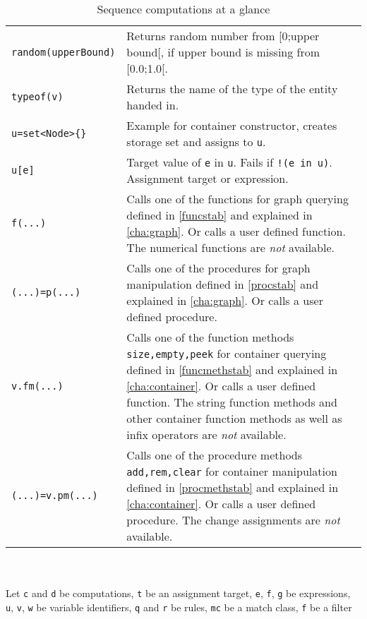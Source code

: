 \begin{table}[htbp]
\begin{minipage}{\linewidth}
\begin{tabularx}{\linewidth}{|lX|}
\texttt{random(upperBound)} & Returns random number from [0;upper bound[, if upper bound is missing from [0.0;1.0[.\\
\texttt{typeof(v)} & Returns the name of the type of the entity handed in.\\
\hline
\texttt{u=set<Node>\{\}} & Example for container constructor, creates storage set and assigns to \texttt{u}.\\
\texttt{u[e]} & Target value of \texttt{e} in \texttt{u}. Fails if \texttt{!(e in u)}. Assignment target or expression.\\
\hline
\texttt{f(...)} & Calls one of the functions for graph querying defined in \ref{funcstab} and explained in \ref{cha:graph}. Or calls a user defined function. The numerical functions are \emph{not} available.\\
\hline
\texttt{(...)=p(...)} & Calls one of the procedures for graph manipulation defined in \ref{procstab} and explained in \ref{cha:graph}. Or calls a user defined procedure.\\
\hline
\texttt{v.fm(...)} & Calls one of the function methods \texttt{size,empty,peek} for container querying defined in \ref{funcmethstab} and explained in \ref{cha:container}. Or calls a user defined function. The string function methods and other container function methods as well as infix operators are \emph{not} available.\\
\hline
\texttt{(...)=v.pm(...)} & Calls one of the procedure methods \texttt{add,rem,clear} for container manipulation defined in \ref{procmethstab} and explained in \ref{cha:container}. Or calls a user defined procedure. The change assignments are \emph{not} available.\\
\hline
\end{tabularx}
\end{minipage}\\
\\ 
{\small Let \texttt{c} and \texttt{d} be computations, \texttt{t} be an assignment target, \texttt{e}, \texttt{f}, \texttt{g} be expressions, \texttt{u}, \texttt{v}, \texttt{w} be variable identifiers, \texttt{q} and \texttt{r} be rules, \texttt{mc} be a match class, \texttt{f} be a filter }
\caption{Sequence computations at a glance}
\label{comptab}
\end{table}
 
